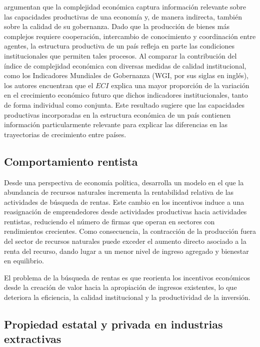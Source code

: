 \documentclass[../../TFM.tex]{subfiles}
\begin{document}
	\textcite{Hausmann2014} argumentan que la complejidad económica captura información relevante sobre las capacidades productivas de una economía y, de manera indirecta, también sobre la calidad de su gobernanza. Dado que la producción de bienes más complejos requiere cooperación, intercambio de conocimiento y coordinación entre agentes, la estructura productiva de un país refleja en parte las condiciones institucionales que permiten tales procesos. Al comparar la contribución del índice de complejidad económica con diversas medidas de calidad institucional, como los Indicadores Mundiales de Gobernanza (WGI, por sus siglas en inglés), los autores encuentran que el $ECI$ explica una mayor proporción de la variación en el crecimiento económico futuro que dichos indicadores institucionales, tanto de forma individual como conjunta. Este resultado sugiere que las capacidades productivas incorporadas en la estructura económica de un país contienen información particularmente relevante para explicar las diferencias en las trayectorias de crecimiento entre países.
	
	\subsection{Comportamiento rentista}
	\label{subsec:comportamiento-rentista}
	
	Desde una perspectiva de economía política, \textcite{Torvik2001} desarrolla un modelo en el que la abundancia de recursos naturales incrementa la rentabilidad relativa de las actividades de búsqueda de rentas. Este cambio en los incentivos induce a una reasignación de emprendedores desde actividades productivas hacia actividades rentistas, reduciendo el número de firmas que operan en sectores con rendimientos crecientes. Como consecuencia, la contracción de la producción fuera del sector de recursos naturales puede exceder el aumento directo asociado a la renta del recurso, dando lugar a un menor nivel de ingreso agregado y bienestar en equilibrio.
	
	El problema de la búsqueda de rentas es que reorienta los incentivos económicos desde la creación de valor hacia la apropiación de ingresos existentes, lo que deteriora la eficiencia, la calidad institucional y la productividad de la inversión.
	
	\subsection{Propiedad estatal y privada en industrias extractivas}
	\label{subsec:propiedad-estatal-privada}
	
\end{document}
